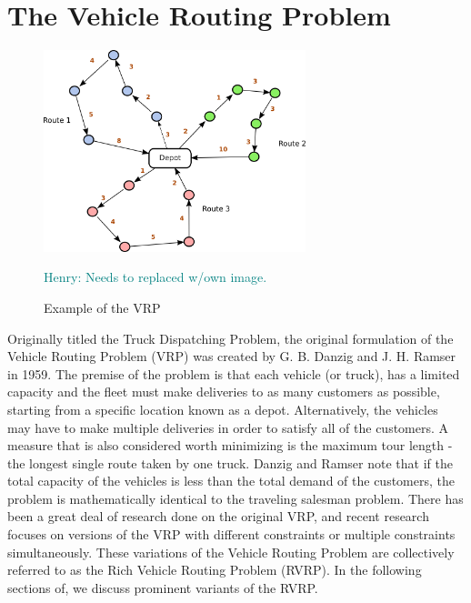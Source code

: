 \documentclass{sig-alternate}
\newcommand{\allcomments}[1]{{#1}}
\newcommand{\hfcomment}[1]{\textcolor{Teal}{\allcomments{Henry: {#1}}}}
\begin{document}
{\section{The Vehicle Routing Problem}
\label{sec:VRP}

\begin{figure}
\centering
\includegraphics[width=3in, keepaspectratio]{vrp1.png}
\caption{Example of the VRP}
\hfcomment{Needs to replaced w/own image.}
\label{fig:VRPgraph}
\end{figure}

Originally titled the Truck Dispatching Problem, the original formulation of the Vehicle Routing Problem (VRP) was created by G. B. Danzig and J. H. Ramser in 1959\cite{Danzig:1959}. The premise of the problem is that each vehicle (or truck), has a limited capacity and the fleet must make deliveries to as many customers as possible, starting from a specific location known as a depot\cite{Caceres-Cruz:2014}. Alternatively, the vehicles may have to make multiple deliveries in order to satisfy all of the customers. A measure that is also considered worth minimizing is the maximum tour length - the longest single route taken by one truck. Danzig and Ramser note that if the total capacity of the vehicles is less than the total demand of the customers, the problem is mathematically identical to the traveling salesman problem. There has been a great deal of research done on the original VRP, and recent research focuses on versions of the VRP with different constraints or multiple constraints simultaneously. These variations of the Vehicle Routing Problem are collectively referred to as the Rich Vehicle Routing Problem\cite{Caceres-Cruz:2014} (RVRP).  In the following sections of, we discuss prominent variants of the RVRP.
}
\end{document}
